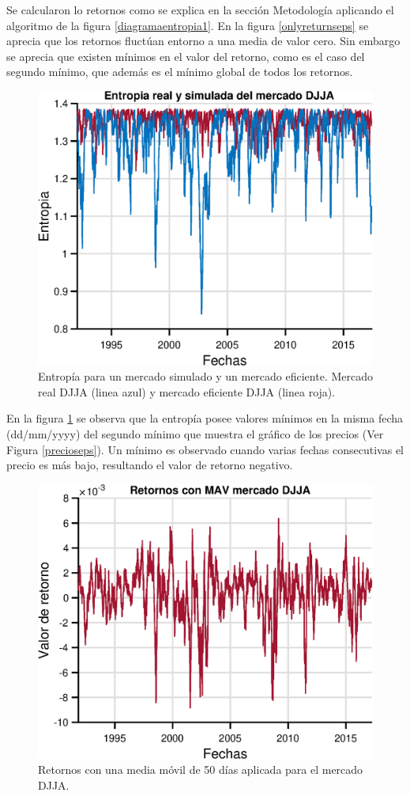 Se calcularon lo retornos como se explica en la sección Metodología aplicando el algoritmo de la figura  \ref{diagramaentropia1}. En la figura \ref{onlyreturnseps} se aprecia que los retornos fluctúan entorno a una media de valor cero. Sin embargo se aprecia que existen mínimos en el valor del retorno, como es el caso del segundo mínimo, que además es el mínimo global de todos los retornos.


\begin{figure}
	\centering
	\includegraphics[width=0.7\linewidth]{figures/onlyentropyeps}
	\caption{Entropía para un mercado simulado y un mercado eficiente. Mercado real DJJA (linea azul) y mercado eficiente DJJA (linea roja).}
	\label{onlyentropyeps}
\end{figure}


En la figura \ref{onlyentropyeps} se observa que la entropía posee valores mínimos en la misma fecha (dd/mm/yyyy) del segundo mínimo que muestra el gráfico de los precios (Ver Figura \ref{precioseps}). Un mínimo es observado cuando varias fechas consecutivas el precio es más bajo, resultando el valor de retorno negativo. 




\begin{figure}
	\centering
	\includegraphics[width=0.7\linewidth]{figures/MAVreturnseps}
	\caption{Retornos con una media móvil de 50 días aplicada para el mercado DJJA.}
	\label{fig:mavreturnseps}
\end{figure}

